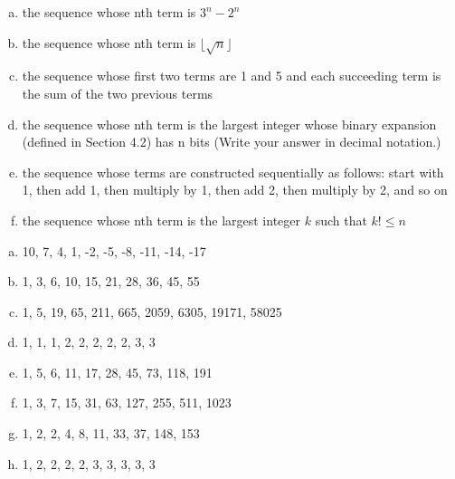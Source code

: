 \begin{itemize}
\begin{enumerate}[a.]
            \item the sequence whose nth term is $3^n - 2^n$
            \item the sequence whose nth term is  $\lfloor \sqrt{n} \rfloor$
            \item the sequence whose first two terms are 1 and 5 and each succeeding term is the sum of the two previous terms
            \item the sequence whose nth term is the largest integer whose binary expansion (defined in Section 4.2) has n bits (Write your answer in decimal notation.)
            \item the sequence whose terms are constructed sequentially as follows: start with 1, then add 1, then multiply by 1, then add 2, then multiply by 2, and so on
            \item the sequence whose nth term is the largest integer $k$ such that $k! \leq n$
         \end{enumerate}
         \answer
         \begin{enumerate}[a.]
            \item 10, 7, 4, 1, -2, -5, -8, -11, -14, -17
            \item 1, 3, 6, 10, 15, 21, 28, 36, 45, 55
            \item 1, 5, 19, 65, 211, 665, 2059, 6305, 19171, 58025
            \item 1, 1, 1, 2, 2, 2, 2, 2, 3, 3
            \item 1, 5, 6, 11, 17, 28, 45, 73, 118, 191
            \item 1, 3, 7, 15, 31, 63, 127, 255, 511, 1023
            \item 1, 2, 2, 4, 8, 11, 33, 37, 148, 153
            \item 1, 2, 2, 2, 2, 3, 3, 3, 3, 3
         \end{enumerate}
\end{itemize}

